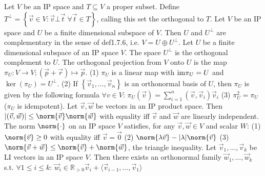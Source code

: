  Let $V$ be an IP space and $T \subseteq V$ a proper subset.
Define $T^{\bot} = \left\{ \vec{v} \in V : \vec{v} \bot \vec{t} \; \forall \vec{t} \in T \right\}$, calling this set the orthogonal to $T$.
 Let $V$ be an IP space and $U$ be a finite dimensional subspace of $V$.
Then $U$ and $U^{\bot}$ are complementary in the sense of def1.7.6, i.e. $V = U \oplus U^{\bot}$.
 Let $U$ be a finite dimensional subspace of an IP space $V$. The space $U^{\bot}$ is the orthogonal complement to $U$. The orthogonal projection from $V$ onto $U$ is the map $\pi_U : V \to V; (\vec{p} + \vec{r}) \mapsto \vec{p}$.
(1) $\pi_U$ is a linear map with $\text{im}{\pi_U} = U$ and $\ker(\pi_U) = U^{\bot}$.
(2) If $\left\{ \vec{v}_1, \dots, \vec{v}_n \right\}$ is an orthonormal basis of $U$, then $\pi_U$ is given by the following formula $\forall v \in V$: $\pi_U(\vec{v}) = \sum_{i=1}^n (\vec{v}, \vec{v}_i)\vec{v}_i$
(3) $\pi_U^2 = \pi_U$ ($\pi_U$ is idempotent).
 Let $\vec{v}, \vec{w}$ be vectors in an IP product space. Then $|(\vec{v}, \vec{w})| \le \norm{\vec{v}}\norm{\vec{w}}$ with equality iff $\vec{v}$ and $\vec{w}$ are linearly independent.
 The norm $\norm{\cdot}$ on an IP space $V$ satisfies, for any $\vec{v}, \vec{w} \in V$ and scalar $W$:
(1) $\norm{\vec{v}} \ge 0$ with equality iff $\vec{v} = \vec{0}$
(2) $\norm{\lambda \vec{v}} - |\lambda| \norm{\vec{v}}$
(3) $\norm{\vec{v} + \vec{w}} \le \norm{\vec{v}} + \norm{\vec{w}}$, the triangle inequality.
 Let $\vec{v}_1, \dots, \vec{v}_k$ be LI vectors in an IP space $V$. Then there exists an orthonormal family $\vec{w}_1, \dots, \vec{w}_k$ s.t. $\forall 1 \le i \le k$: $\vec{w}_i \in \mathbb{R}_{> 0}\vec{v}_i + \langle \vec{v}_{i-1}, \dots, \vec{v}_1 \rangle$